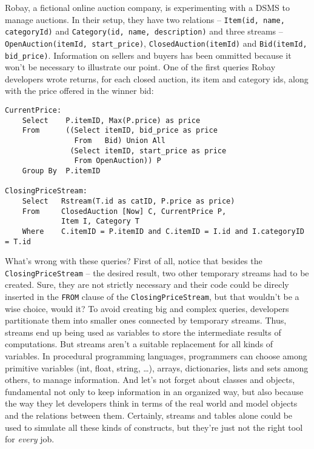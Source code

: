\documentclass{report}
\begin{document}
Robay, a fictional online auction company, is experimenting with a DSMS to manage auctions. In their setup, they have two relations -- \verb=Item(id, name, categoryId)= and \verb=Category(id, name, description)= and three streams -- \verb=OpenAuction(itemId, start_price)=, \verb=ClosedAuction(itemId)= and \verb=Bid(itemId, bid_price)=. Information on sellers and buyers has been ommitted because it won't be necessary to illustrate our point. One of the first queries Robay developers wrote returns, for each closed auction, its item and category ids, along with the price offered in the winner bid:

\begin{verbatim}
CurrentPrice: 
    Select    P.itemID, Max(P.price) as price
    From      ((Select itemID, bid_price as price 
                From   Bid) Union All
               (Select itemID, start_price as price 
                From OpenAuction)) P
    Group By  P.itemID

ClosingPriceStream:
    Select   Rstream(T.id as catID, P.price as price)
    From     ClosedAuction [Now] C, CurrentPrice P, 
             Item I, Category T    
    Where    C.itemID = P.itemID and C.itemID = I.id and I.categoryID = T.id 
\end{verbatim}

What's wrong with these queries? First of all, notice that besides the \verb=ClosingPriceStream= -- the desired result, two other temporary streams had to be created. Sure, they are not strictly necessary and their code could be direcly inserted in the \verb=FROM= clause of the \verb=ClosingPriceStream=, but that wouldn't be a wise choice, would it? To avoid creating big and complex queries, developers partitionate them into smaller ones connected by temporary streams. Thus, streams end up being used as variables to store the intermediate results of computations. But streams aren't a suitable replacement for all kinds of variables. In procedural programming languages, programmers can choose among primitive variables (int, float, string, \dots), arrays, dictionaries, lists and sets among others, to manage information. And let's not forget about classes and objects, fundamental not only to keep information in an organized way, but also because the way they let developers think in terms of the real world and model objects and the relations between them. Certainly, streams and tables alone could be used to simulate all these kinds of constructs, but they're just not the right tool for \emph{every} job.
\end{document}
